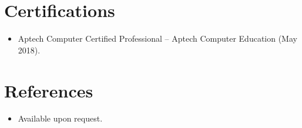 \documentclass[11pt,a4paper,sans]{moderncv}
\begin{document}

\section{Certifications}
\vspace{1pt}
\begin{itemize}
\item{Aptech Computer Certified Professional -- Aptech Computer Education (May 2018).}
\end{itemize}


\section{References}
\vspace{1pt}
\begin{itemize}
\item{Available upon request.}
\end{itemize}
\end{document}
